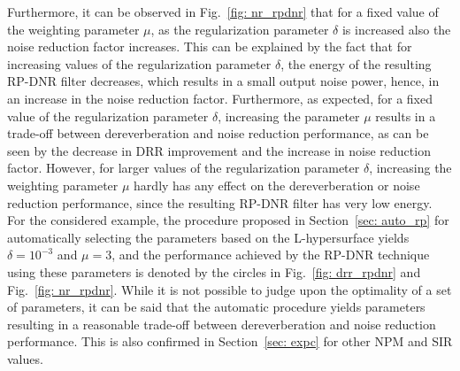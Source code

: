 \documentclass[draftcls,onecolumn,11pt]{IEEEtran}
\begin{document}
Furthermore, it can be observed in Fig.~\ref{fig: nr_rpdnr} that for a fixed value of the weighting parameter $\mu$, as the regularization parameter $\delta$ is increased also the noise reduction factor increases. 
This can be explained by the fact that for increasing values of the regularization parameter $\delta$, the energy of the resulting RP-DNR filter decreases, which results in a small output noise power, hence, in an increase in the noise reduction factor.
Furthermore, as expected, for a fixed value of the regularization parameter $\delta$, increasing the parameter $\mu$ results in a trade-off between dereverberation and noise reduction performance, as can be seen by the decrease in DRR improvement and the increase in noise reduction factor. 
However, for larger values of the regularization parameter $\delta$, increasing the weighting parameter $\mu$ hardly has any effect on the dereverberation or noise reduction performance, since the resulting RP-DNR filter has very low energy.
For the considered example, the procedure proposed in Section~\ref{sec: auto_rp} for automatically selecting the parameters based on the L-hypersurface yields $\delta = 10^{-3}$ and $\mu = 3$, and the performance achieved by the RP-DNR technique using these parameters is denoted by the circles in Fig.~\ref{fig: drr_rpdnr} and Fig.~\ref{fig: nr_rpdnr}.
While it is not possible to judge upon the optimality of a set of parameters, it can be said that the automatic procedure yields parameters resulting in a reasonable trade-off between dereverberation and noise reduction performance.
This is also confirmed in Section~\ref{sec: expc} for other NPM and SIR values.
\end{document}
